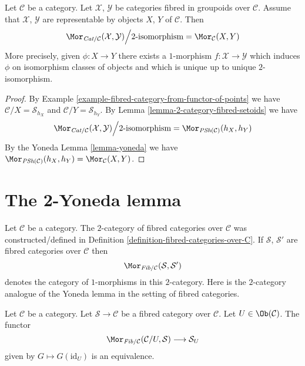 \begin{lemma}
\label{lemma-morphisms-representable-fibred-categories}
Let $\mathcal{C}$ be a category.
Let $\mathcal{X}$, $\mathcal{Y}$ be categories fibred in groupoids
over $\mathcal{C}$. Assume that $\mathcal{X}$, $\mathcal{Y}$
are representable by objects $X$, $Y$ of $\mathcal{C}$.
Then
$$
\Mor_{\textit{Cat}/\mathcal{C}}(\mathcal{X}, \mathcal{Y})
\Big/
2\text{-isomorphism}
=
\Mor_\mathcal{C}(X, Y)
$$
More precisely, given $\phi : X \to Y$ there exists a
$1$-morphism $f : \mathcal{X} \to \mathcal{Y}$ which induces
$\phi$ on isomorphism classes of objects and
which is unique up to unique $2$-isomorphism.
\end{lemma}

\begin{proof}
By
Example \ref{example-fibred-category-from-functor-of-points}
we have $\mathcal{C}/X = \mathcal{S}_{h_X}$ and
$\mathcal{C}/Y = \mathcal{S}_{h_Y}$. By
Lemma \ref{lemma-2-category-fibred-setoids}
we have
$$
\Mor_{\textit{Cat}/\mathcal{C}}(\mathcal{X}, \mathcal{Y})
\Big/
2\text{-isomorphism}
=
\Mor_{\textit{PSh}(\mathcal{C})}(h_X, h_Y)
$$
By the Yoneda
Lemma \ref{lemma-yoneda}
we have $\Mor_{\textit{PSh}(\mathcal{C})}(h_X, h_Y)
= \Mor_\mathcal{C}(X, Y)$.
\end{proof}









\section{The 2-Yoneda lemma}
\label{section-2-yoneda}

\noindent
Let $\mathcal{C}$ be a category. The $2$-category of fibred categories
over $\mathcal{C}$ was constructed/defined in
Definition \ref{definition-fibred-categories-over-C}.
If $\mathcal{S}$, $\mathcal{S}'$ are fibred categories
over $\mathcal{C}$ then
$$
\Mor_{\textit{Fib}/\mathcal{C}}(\mathcal{S}, \mathcal{S}')
$$
denotes the category of $1$-morphisms in this $2$-category.
Here is the $2$-category analogue of the Yoneda lemma
in the setting of fibred categories.

\begin{lemma}
\label{lemma-yoneda-2category-fibred}
Let $\mathcal{C}$ be a category.
Let $\mathcal{S} \to \mathcal{C}$ be a fibred category over $\mathcal{C}$.
Let $U \in \Ob(\mathcal{C})$.
The functor
$$
\Mor_{\textit{Fib}/\mathcal{C}}(\mathcal{C}/U, \mathcal{S})
\longrightarrow
\mathcal{S}_U
$$
given by $G \mapsto G(\text{id}_U)$ is an equivalence.
\end{lemma}

